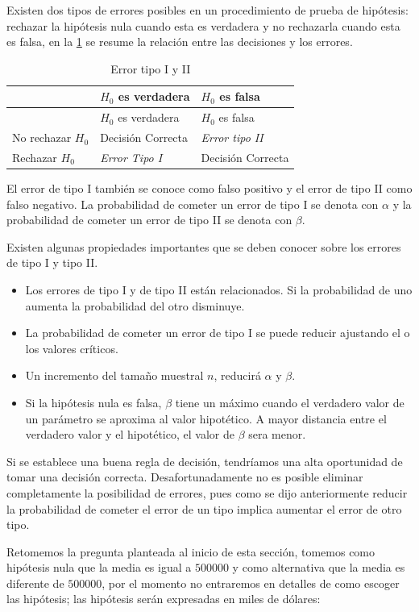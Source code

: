 \documentclass[letterpaper,]{book}
\providecommand{\tightlist}{%
  \setlength{\itemsep}{0pt}\setlength{\parskip}{0pt}}
\begin{document}
Existen dos tipos de errores posibles en un procedimiento de prueba de hipótesis: rechazar la hipótesis nula cuando esta es verdadera y no rechazarla cuando esta es falsa, en la \ref{tab:err} se resume la relación entre las decisiones y los errores.

\begin{longtable}[]{@{}lll@{}}
\caption{\label{tab:err}Error tipo I y II}\tabularnewline
\toprule
& \(H_0\) es verdadera & \(H_0\) es falsa\tabularnewline
\midrule
\endfirsthead
\toprule
& \(H_0\) es verdadera & \(H_0\) es falsa\tabularnewline
\midrule
\endhead
No rechazar \(H_0\) & Decisión Correcta & \emph{Error tipo II}\tabularnewline
Rechazar \(H_0\) & \emph{Error Tipo I} & Decisión Correcta\tabularnewline
\bottomrule
\end{longtable}

El error de tipo I también se conoce como falso positivo y el error de tipo II como falso negativo. La probabilidad de cometer un error de tipo I se denota con \(\alpha\) y la probabilidad de cometer un error de tipo II se denota con \(\beta\).

Existen algunas propiedades importantes que se deben conocer sobre los errores de tipo I y tipo II.

\begin{itemize}
\tightlist
\item
  Los errores de tipo I y de tipo II están relacionados. Si la probabilidad de uno aumenta la probabilidad del otro disminuye.
\item
  La probabilidad de cometer un error de tipo I se puede reducir ajustando el o los valores críticos.
\item
  Un incremento del tamaño muestral \(n\), reducirá \(\alpha\) y \(\beta\).
\item
  Si la hipótesis nula es falsa, \(\beta\) tiene un máximo cuando el verdadero valor de un parámetro se aproxima al valor hipotético. A mayor distancia
  entre el verdadero valor y el hipotético, el valor de \(\beta\) sera menor.
\end{itemize}

Si se establece una buena regla de decisión, tendríamos una alta oportunidad de tomar una decisión correcta. Desafortunadamente no es posible eliminar completamente la posibilidad de errores, pues como se dijo anteriormente reducir la probabilidad de cometer el error de un tipo implica aumentar el error de otro tipo.

Retomemos la pregunta planteada al inicio de esta sección, tomemos como hipótesis nula que la media es igual a \(500000\) y como alternativa que la media es diferente de \(500000\), por el momento no entraremos en detalles de como escoger las hipótesis; las hipótesis serán expresadas en miles de dólares:
\end{document}
